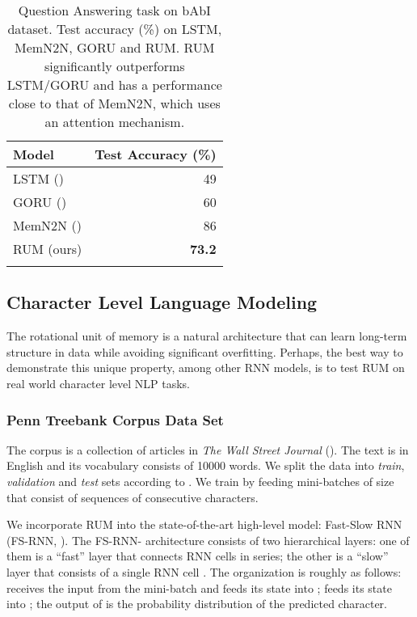 \documentclass{article} \usepackage{iclr2018_conference,times}
\begin{document}
\begin{table}[h!]
\begin{center}
\begin{tabular}{lr}
\toprule
Model  & Test Accuracy (\%) \\ 
\hline
LSTM (\cite{weston2015towards})  & 49  \\ 
GORU (\cite{jing2017gated}) & 60  \\
MemN2N (\cite{sukhbaatar2015end}) & 86 \\
RUM (ours) & \textbf{73.2}\\
\bottomrule \\
\end{tabular}
\caption{Question Answering task on bAbI dataset. Test accuracy (\%) on LSTM, MemN2N, GORU
and RUM. RUM significantly outperforms LSTM/GORU and has a performance close to that of
MemN2N, which uses an attention mechanism.}
\label{tbl:babi}
\end{center}
\end{table}





\subsection{Character Level Language Modeling} \label{main:sec:nlp}
The rotational unit of memory is a natural architecture that can learn long-term structure in data while avoiding significant overfitting. Perhaps, the best way to demonstrate this unique property, among other RNN models, is to test RUM on real world character level NLP tasks.
\subsubsection{Penn Treebank Corpus Data Set}
The corpus is a collection of articles in \textit{The Wall Street Journal} (\cite{marcus1993ptb}). The text is in English and its vocabulary consists of 10000 words. We split the data into \textit{train}, \textit{validation} and \textit{test} sets according to \cite{mikolov2012ptb}. We train by feeding mini-batches of size  that consist of sequences of  consecutive characters. 

We incorporate RUM into the state-of-the-art high-level model: Fast-Slow RNN (FS-RNN, \cite{mujika2017ptb}). The FS-RNN- architecture consists of two hierarchical layers: one of them is a ``fast'' layer that connects  RNN cells  in series; the other is a ``slow'' layer that consists of a single RNN cell . The organization is roughly as follows:  receives the input from the mini-batch and feeds its state into ;  feeds its state into ; the output of  is the probability distribution of the predicted character. 
\end{document}
